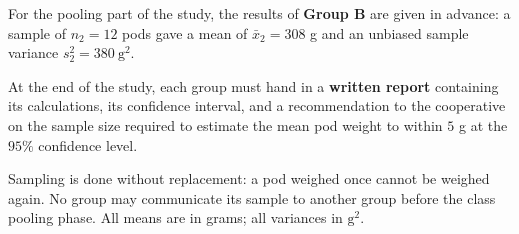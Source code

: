 \documentclass[11pt]{article}
\newcommand{\cle}[1]{{\popxbold\color{popdark}#1}}
\newcounter{popsec}
\newcounter{popsub}
\newcommand{\courssub}[1]{%
  \stepcounter{popsub}%
  \par\vspace{9pt}\noindent{\popxbold\fontsize{11.5}{13}\selectfont\color{popink}{\color{poporange}\thepopsec.\thepopsub}\hspace{6pt}#1}\par\nopagebreak\vspace{4pt}
}
\begin{document}
For the pooling part of the study, the results of \textbf{Group B} are given in advance: a sample of $n_2 = 12$ pods gave a mean of $\bar{x}_2 = 308$ g and an unbiased sample variance $s_2^2 = 380\ \mathrm{g}^2$.

At the end of the study, each group must hand in a \textbf{written report} containing its calculations, its confidence interval, and a recommendation to the cooperative on the sample size required to estimate the mean pod weight to within $5$ g at the $95\%$ confidence level.

\begin{attention}
Sampling is done \cle{without replacement}: a pod weighed once cannot be weighed again. No group may communicate its sample to another group before the class pooling phase. All means are in grams; all variances in $\mathrm{g}^2$.
\end{attention}

\courssub{Tasks}
\end{document}
